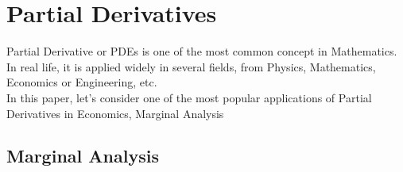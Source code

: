 \documentclass[a4paper]{article}
\begin{document}
\begin{titlepage}
\begin{center}
\begin{minipage}{0.4\textwidth}
\begin{flushright}
			\end{flushright}
		\end{minipage}
		
		\vfill
		
		\vspace{2cm}
		{\large} %
	\end{center}
\end{titlepage}

\thispagestyle{empty}
\newpage
\tableofcontents
\newpage

\section{Partial Derivatives}
Partial Derivative or PDEs is one of the most common concept in Mathematics. In real life, it is applied widely in several fields, from Physics, Mathematics, Economics or Engineering, etc. \\
In this paper, let's consider one of the most popular applications of Partial Derivatives in Economics, Marginal Analysis
\subsection{Marginal Analysis}
\end{document}
